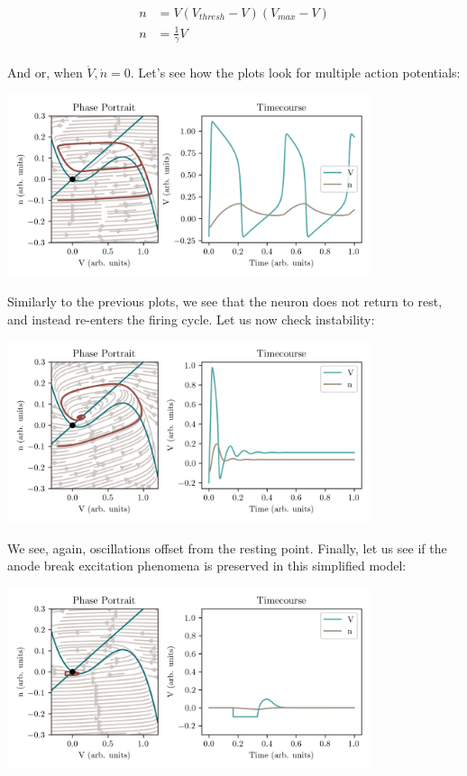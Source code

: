 \begin{equation}
\begin{split}
    n &= V (V_{thresh} - V)(V_{max} - V) \\
    n &= \frac{1}{\gamma} V \\
\end{split}
\end{equation}

And or, when $\dot{V}, \dot{n} = 0$. Let's see how the plots look for multiple action potentials: 

\begin{center}
\includegraphics[width=0.8\textwidth]{images/models/fhnphase2.png}
\end{center}

Similarly to the previous plots, we see that the neuron does not return to rest, and instead re-enters the firing cycle. Let us now check instability: 

\begin{center}
\includegraphics[width=0.8\textwidth]{images/models/fhnphase3.png}
\end{center}

We see, again, oscillations offset from the resting point. Finally, let us see if the anode break excitation phenomena is preserved in this simplified model:

\begin{center}
\includegraphics[width=0.8\textwidth]{images/models/fhnanode1.png}
\end{center}


